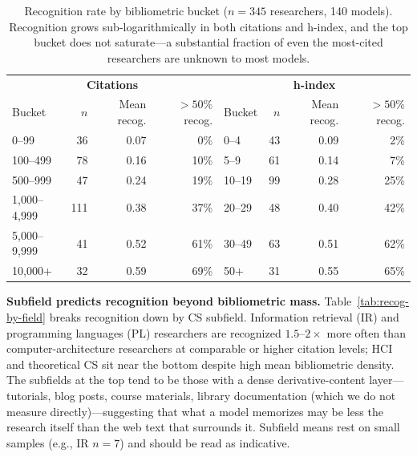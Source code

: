 \documentclass[11pt]{article}
\begin{document}
\begin{table}[H]
\centering
\small
\caption{Recognition rate by bibliometric bucket ($n = 345$ researchers, 140 models). Recognition grows sub-logarithmically in both citations and h-index, and the top bucket does not saturate---a substantial fraction of even the most-cited researchers are unknown to most models.}
\label{tab:citation-hindex-buckets}
\begin{tabular}{lrrr@{\hskip 18pt}lrrr}
\toprule
\multicolumn{4}{c}{\textbf{Citations}} & \multicolumn{4}{c}{\textbf{h-index}} \\
Bucket & $n$ & Mean recog. & $>\!50\%$ recog. & Bucket & $n$ & Mean recog. & $>\!50\%$ recog. \\
\midrule
0--99        & 36  & 0.07 & 0\%   & 0--4   & 43  & 0.09 & 2\%   \\
100--499     & 78  & 0.16 & 10\%  & 5--9   & 61  & 0.14 & 7\%   \\
500--999     & 47  & 0.24 & 19\%  & 10--19 & 99  & 0.28 & 25\%  \\
1{,}000--4{,}999 & 111 & 0.38 & 37\% & 20--29 & 48  & 0.40 & 42\%  \\
5{,}000--9{,}999 & 41  & 0.52 & 61\% & 30--49 & 63  & 0.51 & 62\%  \\
10{,}000$+$  & 32  & 0.59 & 69\%  & 50$+$  & 31  & 0.55 & 65\%  \\
\bottomrule
\end{tabular}
\end{table}

\textbf{Subfield predicts recognition beyond bibliometric mass.} Table~\ref{tab:recog-by-field} breaks recognition down by CS subfield. Information retrieval (IR) and programming languages (PL) researchers are recognized $1.5$--$2\times$ more often than computer-architecture researchers at comparable or higher citation levels; HCI and theoretical CS sit near the bottom despite high mean bibliometric density. The subfields at the top tend to be those with a dense derivative-content layer---tutorials, blog posts, course materials, library documentation (which we do not measure directly)---suggesting that what a model memorizes may be less the research itself than the web text that surrounds it. Subfield means rest on small samples (e.g., IR $n=7$) and should be read as indicative.
\end{document}
